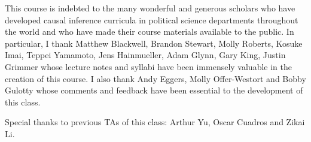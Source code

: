 \documentclass[11pt, article, oneside]{memoir}
\theoremstyle{Assumption}
\begin{document}
This course is indebted to the many wonderful and generous scholars who have developed causal inference curricula in political science departments throughout the world and who have made their course materials available to the public. In particular, I thank Matthew Blackwell, Brandon Stewart, Molly Roberts, Kosuke Imai, Teppei Yamamoto, Jens Hainmueller, Adam Glynn, Gary King, Justin Grimmer whose lecture notes and syllabi have been immensely valuable in the creation of this course. I also thank Andy Eggers, Molly Offer-Westort and Bobby Gulotty whose comments and feedback have been essential to the development of this class.

Special thanks to previous TAs of this class: Arthur Yu, Oscar Cuadros and Zikai Li.
\end{document}
